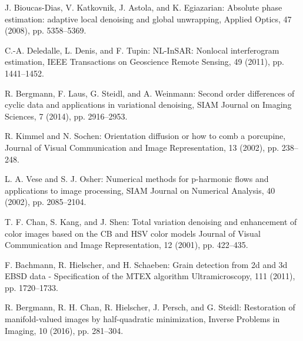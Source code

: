 \documentclass[twocolumn]{svjour3}          %
\begin{document}
%
%



\begin{thebibliography}{16}
%
J. Bioucas-Dias, V. Katkovnik, J. Astola, and K. Egiazarian: 
Absolute phase estimation: adaptive local denoising and global unwrapping, 
Applied Optics, 47 (2008), pp. 5358–5369.

C.-A. Deledalle, L. Denis, and F. Tupin:
NL-InSAR: Nonlocal interferogram estimation, 
IEEE Transactions on Geoscience Remote Sensing, 49 (2011), pp. 1441–1452.

R. Bergmann, F. Laus, G. Steidl, and A. Weinmann: 
Second order differences of cyclic data and applications in variational denoising,
SIAM Journal on Imaging Sciences, 7 (2014), pp. 2916–2953.

R. Kimmel and N. Sochen:
Orientation diffusion or how to comb a porcupine, 
Journal of Visual Communication and Image Representation, 13 (2002), pp. 238–248.

L. A. Vese and S. J. Osher:
Numerical methods for p-harmonic flows and applications to image processing,
SIAM Journal on Numerical Analysis, 40 (2002), pp. 2085–2104.

T. F. Chan, S. Kang, and J. Shen:
Total variation denoising and enhancement of color images based on the CB and HSV color models
Journal of Visual Communication and Image Representation, 12 (2001), pp. 422–435.

F. Bachmann, R. Hielscher, and H. Schaeben:
Grain detection from 2d and 3d EBSD data - Specification of the MTEX algorithm
Ultramicroscopy, 111 (2011), pp. 1720–1733.

R. Bergmann, R. H. Chan, R. Hielscher, J. Persch, and G. Steidl:
Restoration of manifold-valued images by half-quadratic minimization,
Inverse Problems in Imaging, 10 (2016), pp. 281–304.


\end{thebibliography}
\end{document}
